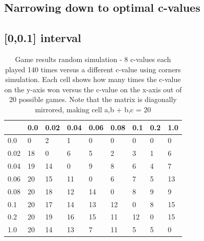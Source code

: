 \documentclass[11pt,a4paper]{article}
\begin{document}
\begin{appendices}
\section{Narrowing down to optimal c-values}
\subsection{[0,0.1] interval}
\begin{table}[]
	\centering
	\begin{tabular}{|l|l|l|l|l|l|l|l|l|}
		\hline
		& 0.0 & 0.02 & 0.04 & 0.06 & 0.08 & 0.1 & 0.2 & 1.0 \\ \hline
		0.0  & 0   & 2    & 1    & 0    & 0    & 0   & 0   & 0   \\ \hline
		0.02 & 18  & 0    & 6    & 5    & 2    & 3   & 1   & 6   \\ \hline
		0.04 & 19  & 14   & 0    & 9    & 8    & 6   & 4   & 7   \\ \hline
		0.06 & 20  & 15   & 11   & 0    & 6    & 7   & 5   & 13  \\ \hline
		0.08 & 20  & 18   & 12   & 14   & 0    & 8   & 9   & 9   \\ \hline
		0.1  & 20  & 17   & 14   & 13   & 12   & 0   & 8   & 15  \\ \hline
		0.2  & 20  & 19   & 16   & 15   & 11   & 12  & 0   & 15  \\ \hline
		1.0  & 20  & 14   & 13   & 7    & 11   & 5   & 5   & 0   \\ \hline
	\end{tabular}
	\caption{Game results random simulation - 8 c-values each played 140 times versus a different c-value using corners simulation. Each cell shows how many times the c-value on the y-axis won versus the c-value on the x-axis out of 20 possible games. Note that the matrix is diagonally mirrored, making cell a,b + b,c = 20}
	\label{table:ranking-matrix-random-zero}
\end{table}


\end{appendices}
\end{document}
